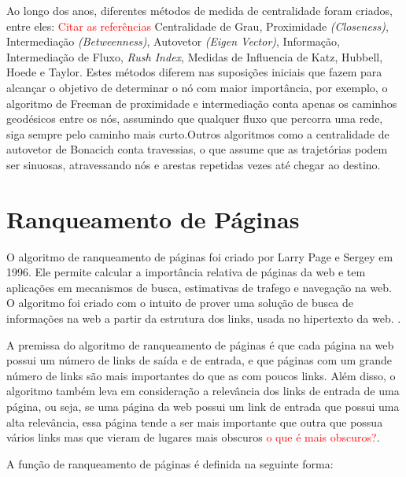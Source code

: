Ao longo dos anos, diferentes métodos de medida de centralidade foram criados, entre eles: \textcolor{red}{Citar as referências}
Centralidade de Grau, Proximidade \textit{(Closeness)}, Intermediação \textit{(Betweenness)}, Autovetor \textit{(Eigen Vector)}, Informação, Intermediação de Fluxo, \textit{Rush Index}, Medidas de Influencia de Katz, Hubbell, Hoede e Taylor. Estes métodos diferem nas suposições
iniciais que fazem para alcançar o objetivo de determinar o nó com maior importância, por exemplo, o algoritmo de Freeman de proximidade e intermediação conta apenas os caminhos geodésicos entre os nós, assumindo que qualquer fluxo que percorra uma rede, siga sempre pelo caminho mais curto.Outros algoritmos como a centralidade de autovetor de Bonacich conta travessias, o que assume que as trajetórias podem ser sinuosas, atravessando nós e arestas repetidas vezes até chegar ao destino\cite{centrality}.


\section{Ranqueamento de Páginas}
\label{ref:ran}
O algoritmo de ranqueamento de páginas foi criado por Larry Page e Sergey em 1996. Ele permite calcular a importância relativa de páginas da web e tem aplicações em mecanismos de busca, estimativas de trafego e navegação na web. O algoritmo foi criado com o intuito de prover uma solução de busca de informações na web a partir da estrutura dos links, usada no hipertexto da web. \cite{pageRank}.

A premissa do algoritmo de ranqueamento de páginas é que cada página na web possui um número de links de saída e de entrada, e que páginas com um grande número de links são mais importantes do que as com poucos links. Além disso, o algoritmo também leva em consideração a relevância dos links de entrada de uma página, ou seja, se uma página da web possui um link de entrada que possui uma alta relevância, essa página tende a ser mais importante que outra que possua vários links mas que vieram de lugares mais obscuros \textcolor{red}{o que é mais obscuros?}.

A função de ranqueamento de páginas é definida na seguinte forma:

